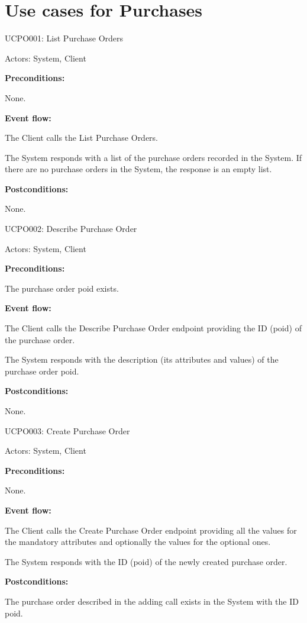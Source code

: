 \section{Use cases for Purchases}

\begin{ucbox}{UCPO001: List Purchase Orders}
\label{UCPO001}

Actors: System, Client

\textbf{Preconditions:}

\ucitem None.

\textbf{Event flow:}

\ucitem The Client calls the List Purchase Orders.

\ucitem The System responds with a list of the purchase orders recorded in the System. If there are no purchase orders in the System, the response is an empty list.

\textbf{Postconditions:}

\ucitem None.

\end{ucbox}

\begin{ucbox}{UCPO002: Describe Purchase Order}
\label{UCPO002}

Actors: System, Client

\textbf{Preconditions:} 

\ucitem The purchase order poid exists.

\textbf{Event flow:}

\ucitem The Client calls the Describe Purchase Order endpoint providing the ID (poid) of the purchase order.

\ucitem The System responds with the description (its attributes and values) of the purchase order poid.

\textbf{Postconditions:}

\ucitem None.

\end{ucbox}

\begin{ucbox}{UCPO003: Create Purchase Order}
\label{UCPO003}

Actors: System, Client

\textbf{Preconditions:}

\ucitem None.

\textbf{Event flow:}

\ucitem The Client calls the Create Purchase Order endpoint providing all the values for the mandatory attributes and optionally the values for the optional ones.

\ucitem The System responds with the ID (poid) of the newly created purchase order.

\textbf{Postconditions:}

\ucitem The purchase order described in the adding call exists in the System with the ID poid.

\end{ucbox}

